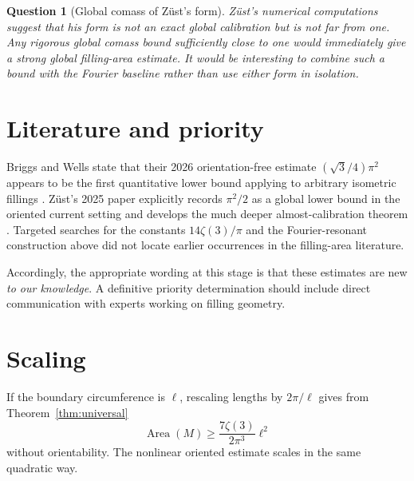 \documentclass[11pt]{article}
\newtheorem{question}[theorem]{Question}
\newcommand{\Area}{\operatorname{Area}}
\begin{document}
\begin{question}[Global comass of Z\"ust's form]
Z\"ust's numerical computations suggest that his form is not an exact
global calibration but is not far from one.  Any rigorous global comass
bound sufficiently close to one would immediately give a strong global
filling-area estimate.  It would be interesting to combine such a bound
with the Fourier baseline rather than use either form in isolation.
\end{question}

\section{Literature and priority}

Briggs and Wells state that their 2026 orientation-free estimate
$(\sqrt3/4)\pi^2$ appears to be the first quantitative lower bound applying
to arbitrary isometric fillings \cite{BriggsWells2026}.  Z\"ust's 2025
paper explicitly records $\pi^2/2$ as a global lower bound in the oriented
current setting and develops the much deeper almost-calibration theorem
\cite{Zuest2025}.  Targeted searches for the constants
$14\zeta(3)/\pi$ and the Fourier-resonant construction above did not locate
earlier occurrences in the filling-area literature.

Accordingly, the appropriate wording at this stage is that these estimates
are new \emph{to our knowledge}.  A definitive priority determination
should include direct communication with experts working on filling
geometry.

\section{Scaling}

If the boundary circumference is $\ell$, rescaling lengths by
$2\pi/\ell$ gives from Theorem~\ref{thm:universal}
\[
        \Area(M)
        \ge
        \frac{7\zeta(3)}{2\pi^3}\ell^2
\]
without orientability.  The nonlinear oriented estimate scales in the same
quadratic way.
\end{document}
